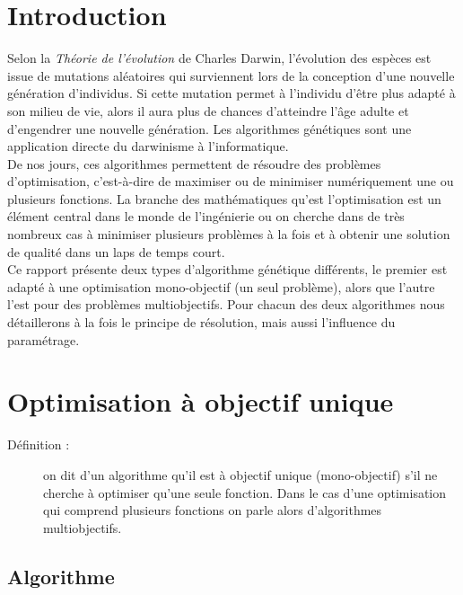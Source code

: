 \documentclass[12pt]{report}
\begin{document}
  \chapter{Introduction}
    Selon la \emph{Théorie de l'évolution} \cite{darwin} de Charles Darwin, l'évolution des espèces est issue de mutations aléatoires qui surviennent lors de la conception d'une nouvelle génération d'individus. Si cette mutation permet à l'individu d'être plus adapté à son milieu de vie, alors il aura plus de chances d'atteindre l'âge adulte et d'engendrer une nouvelle génération.
    Les algorithmes génétiques sont une application directe du darwinisme à l'informatique.\\
    De nos jours, ces algorithmes permettent de résoudre des problèmes d'optimisation, c'est-à-dire de maximiser ou de minimiser numériquement une ou plusieurs fonctions.
    La branche des mathématiques qu'est l'optimisation est un élément central dans le monde de l'ingénierie ou on cherche dans de très nombreux cas à minimiser plusieurs problèmes à la fois et à obtenir une solution de qualité dans un laps de temps court.\\
    Ce rapport présente deux types d'algorithme génétique différents, le premier est adapté à une optimisation mono-objectif (un seul problème), alors que l'autre l'est pour des problèmes multiobjectifs. Pour chacun des deux algorithmes nous détaillerons à la fois le principe de résolution, mais aussi l'influence du paramétrage.

  \tableofcontents
  \chapter{Optimisation à objectif unique}
    \begin{description}
      \item[Définition :] on dit d'un algorithme qu'il est à objectif unique (mono-objectif) s'il ne cherche à optimiser qu'une seule fonction. Dans le cas d'une optimisation qui comprend plusieurs fonctions on parle alors d'algorithmes multiobjectifs.
    \end{description}
    \section{Algorithme}
\end{document}
